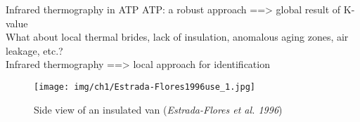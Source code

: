 \begin{frame}{Infrared thermography in ATP}
\small
ATP: a robust approach ==> \alert{global} result of K-value\\
\pause
What about local thermal brides, lack of insulation, anomalous aging zones, air leakage, etc.?\\
\pause
Infrared thermography ==> \alert{local} approach for identification
\pause
    \begin{figure}
        \centering
        \texttt{[image: img/ch1/Estrada-Flores1996use\_1.jpg]}
        \caption{Side view of an insulated van (\textit{Estrada-Flores et al. 1996})}
    \end{figure}
\end{frame}

